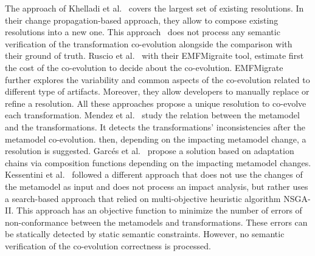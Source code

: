The approach of Khelladi et al.~\cite{khelladi2018change} covers the largest set of existing resolutions. In their change propagation-based approach, they allow to compose existing resolutions into a new one. This approach~\cite{khelladi2018change} does not process any semantic verification of the transformation co-evolution alongside the comparison with their ground of truth. Ruscio et al.~\cite{di2011needed} with their EMFMigraite tool, estimate first the cost of the co-evolution to decide about the co-evolution. EMFMigrate further explores the variability and common aspects of the co-evolution related to different type of artifacts. Moreover, they allow developers to manually replace or refine a resolution. All these approaches propose a unique resolution to co-evolve each transformation. Mendez et al.~\cite{mendez2010towards} study the relation between the metamodel and the transformations. It detects the transformations' inconsistencies after the metamodel co-evolution. then, depending on the impacting metamodel change, a resolution is suggested.
Garcés et al.~\cite{garces2014adapting} propose a solution based on adaptation chains via composition functions depending on the impacting metamodel changes.
Kessentini et al.~\cite{kessentini2018automated} followed a different approach that does not use the changes of the metamodel as input and does not process an impact analysis, but rather uses a search-based approach that relied on multi-objective heuristic algorithm NSGA-II. This approach has an objective function to minimize the number of errors of non-conformance between the metamodels and transformations. These errors can be statically detected by static semantic constraints. However, no semantic verification of the co-evolution correctness is processed.



